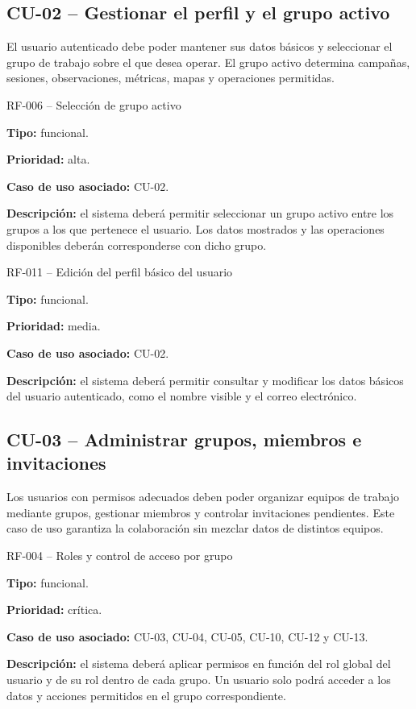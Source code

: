 \subsection{CU-02 -- Gestionar el perfil y el grupo activo}

El usuario autenticado debe poder mantener sus datos básicos y seleccionar el
grupo de trabajo sobre el que desea operar. El grupo activo determina campañas,
sesiones, observaciones, métricas, mapas y operaciones permitidas.

\begin{requisitocard}{RF-006 -- Selección de grupo activo}

\textbf{Tipo:} funcional.

\textbf{Prioridad:} alta.

\textbf{Caso de uso asociado:} CU-02.

\textbf{Descripción:} el sistema deberá permitir seleccionar un grupo activo entre
los grupos a los que pertenece el usuario. Los datos mostrados y las operaciones
disponibles deberán corresponderse con dicho grupo.

\end{requisitocard}

\begin{requisitocard}{RF-011 -- Edición del perfil básico del usuario}

\textbf{Tipo:} funcional.

\textbf{Prioridad:} media.

\textbf{Caso de uso asociado:} CU-02.

\textbf{Descripción:} el sistema deberá permitir consultar y modificar los datos
básicos del usuario autenticado, como el nombre visible y el correo electrónico.

\end{requisitocard}

\subsection{CU-03 -- Administrar grupos, miembros e invitaciones}

Los usuarios con permisos adecuados deben poder organizar equipos de trabajo
mediante grupos, gestionar miembros y controlar invitaciones pendientes. Este
caso de uso garantiza la colaboración sin mezclar datos de distintos equipos.

\begin{requisitocard}{RF-004 -- Roles y control de acceso por grupo}

\textbf{Tipo:} funcional.

\textbf{Prioridad:} crítica.

\textbf{Caso de uso asociado:} CU-03, CU-04, CU-05, CU-10, CU-12 y CU-13.

\textbf{Descripción:} el sistema deberá aplicar permisos en función del rol global
del usuario y de su rol dentro de cada grupo. Un usuario solo podrá acceder a los
datos y acciones permitidos en el grupo correspondiente.

\end{requisitocard}

